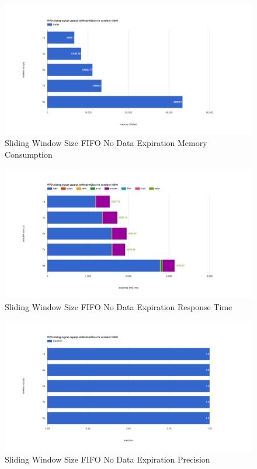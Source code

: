 \begin{figure}[!htbp]
    \centering
    \includegraphics[width=\textwidth]{img/app3-slide-ws-fifo-no-m.png}
    \caption{Sliding Window Size FIFO No Data Expiration Memory Consumption}
\end{figure}
\begin{figure}[!htbp]
    \centering
    \includegraphics[width=\textwidth]{img/app3-slide-ws-fifo-no-r.png}
    \caption{Sliding Window Size FIFO No Data Expiration Response Time}
\end{figure}
\begin{figure}[!htbp]
    \centering
    \includegraphics[width=\textwidth]{img/app3-slide-ws-fifo-no-p.png}
    \caption{Sliding Window Size FIFO No Data Expiration Precision}
\end{figure}
